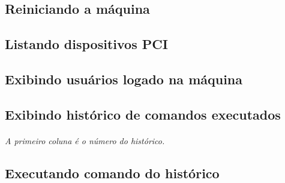 \documentclass[a4paper,9pt]{extarticle}
\begin{document}
\begin{multicols}{2}
	
\subsection{Reiniciando a máquina}
	
	
\subsection{Listando dispositivos PCI}
	
	
\subsection{Exibindo usuários logado na máquina}

	
\subsection{Exibindo histórico de comandos executados} 
	
	\paragraph{} \emph{A primeiro coluna é o número do histórico.}
	
\subsection{Executando comando do histórico}



\end{multicols}
\end{document}
